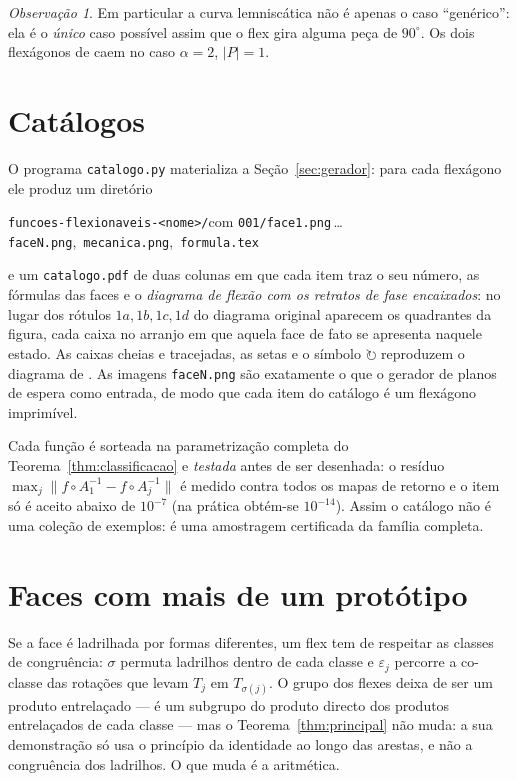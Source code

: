 \documentclass[11pt,a4paper]{article}
\theoremstyle{plain}
\theoremstyle{definition}
\theoremstyle{remark}
\newtheorem{observacao}[teorema]{Observação}
\begin{document}
\begin{observacao}
Em particular a curva lemniscática não é apenas o caso ``genérico'': ela é o
\emph{único} caso possível assim que o flex gira alguma peça de $90^\circ$.
Os dois flexágonos de \cite{manual} caem no caso $\alpha=2$, $|P|=1$.
\end{observacao}

\section{Catálogos}\label{sec:catalogo}

O programa \texttt{catalogo.py} materializa a Seção~\ref{sec:gerador}: para cada
flexágono ele produz um diretório
\begin{center}
\texttt{funcoes-flexionaveis-<nome>/}\quad com\quad
\texttt{001/face1.png}\,\ldots\,\texttt{faceN.png},\ \texttt{mecanica.png},\
\texttt{formula.tex}
\end{center}
e um \texttt{catalogo.pdf} de duas colunas em que cada item traz o seu número,
as fórmulas das faces e o \emph{diagrama de flexão com os retratos de fase
encaixados}: no lugar dos rótulos $1a,1b,1c,1d$ do diagrama original aparecem os
quadrantes da figura, cada caixa no arranjo em que aquela face de fato se
apresenta naquele estado. As caixas cheias e tracejadas, as setas e o símbolo
$\circlearrowright$ reproduzem o diagrama de \cite{enimar}. As imagens
\texttt{faceN.png} são exatamente o que o gerador de planos de \cite{manual}
espera como entrada, de modo que cada item do catálogo é um flexágono
imprimível.

Cada função é sorteada na parametrização completa do
Teorema~\ref{thm:classificacao} e \emph{testada} antes de ser desenhada:
o resíduo $\max_j\|f\circ A_1^{-1}-f\circ A_j^{-1}\|$ é medido contra todos os
mapas de retorno e o item só é aceito abaixo de $10^{-7}$ (na prática obtém-se
$10^{-14}$). Assim o catálogo não é uma coleção de exemplos: é uma amostragem
certificada da família completa.

\section{Faces com mais de um protótipo}\label{sec:multiproto}

Se a face é ladrilhada por formas diferentes, um flex tem de respeitar as
classes de congruência: $\sigma$ permuta ladrilhos dentro de cada classe e
$\varepsilon_j$ percorre a co-classe das rotações que levam $T_j$ em
$T_{\sigma(j)}$. O grupo dos flexes deixa de ser um produto entrelaçado ---
é um subgrupo do produto directo dos produtos entrelaçados de cada classe ---
mas o Teorema~\ref{thm:principal} não muda: a sua demonstração só usa o
princípio da identidade ao longo das arestas, e não a congruência dos
ladrilhos. O que muda é a aritmética.
\end{document}
